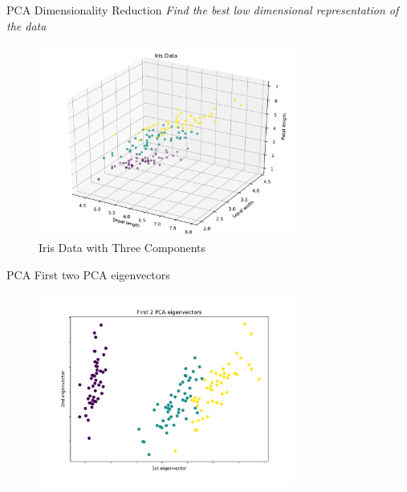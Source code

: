 \documentclass[10pt]{beamer}
\begin{document}
\begin{frame}{PCA Dimensionality Reduction}
\emph{Find the best low dimensional representation of the data}
		\begin{figure}
			\caption{Iris Data with Three Components}
			\includegraphics[width=0.75\textwidth, center, trim=0cm 0cm 0 0cm]{images/Iris_Data_3comp.pdf}
	\end{figure}
\end{frame}

\begin{frame}{PCA}
First two PCA eigenvectors
		\begin{figure}	
			\includegraphics[width=0.75\textwidth, center, trim=0cm 0cm 0 0cm]{images/Iris_PCA.pdf}
	\end{figure}
\end{frame}
\end{document}
